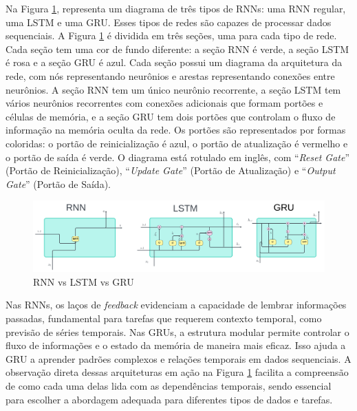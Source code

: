  Na Figura \ref{fig:rnn-vs-lstm-vs-gru-1024x308}, representa um diagrama de três tipos de RNNs: uma RNN regular, uma LSTM e uma GRU. Esses tipos de redes são capazes de processar dados sequenciais. A  Figura \ref{fig:rnn-vs-lstm-vs-gru-1024x308} é dividida em três seções, uma para cada tipo de rede. Cada seção tem uma cor de fundo diferente: a seção RNN é verde, a seção LSTM é rosa e a seção GRU é azul. Cada seção possui um diagrama da arquitetura da rede, com nós representando neurônios e arestas representando conexões entre neurônios. A seção RNN tem um único neurônio recorrente, a seção LSTM tem vários neurônios recorrentes com conexões adicionais que formam portões e células de memória, e a seção GRU tem dois portões que controlam o fluxo de informação na memória oculta da rede. Os portões são representados por formas coloridas: o portão de reinicialização é azul, o portão de atualização é vermelho e o portão de saída é verde. O diagrama está rotulado em inglês, com ``\textit{Reset Gate}'' (Portão de Reinicialização), ``\textit{Update Gate}'' (Portão de Atualização) e ``\textit{Output Gate}'' (Portão de Saída). 
 
 \begin{figure}[!htb]
 	\centering
 	\caption{RNN vs LSTM vs GRU}
 	\label{fig:rnn-vs-lstm-vs-gru-1024x308}
 	\includegraphics[width=\linewidth]{Modelos/Figuras/RNN-vs-LSTM-vs-GRU-1024x308}
 	
 \end{figure}
 
 
 Nas RNNs, os laços de \textit{feedback} evidenciam a capacidade de lembrar informações passadas, fundamental para tarefas que requerem contexto temporal, como previsão de séries temporais.
 Nas GRUs, a estrutura modular permite controlar o fluxo de informações e o estado da memória de maneira mais eficaz. Isso ajuda a GRU a aprender padrões complexos e relações temporais em dados sequenciais.
 A observação direta dessas arquiteturas em ação na Figura \ref{fig:rnn-vs-lstm-vs-gru-1024x308} facilita a compreensão de como cada uma delas lida com as dependências temporais, sendo essencial para escolher a abordagem adequada para diferentes tipos de dados e tarefas.
 
